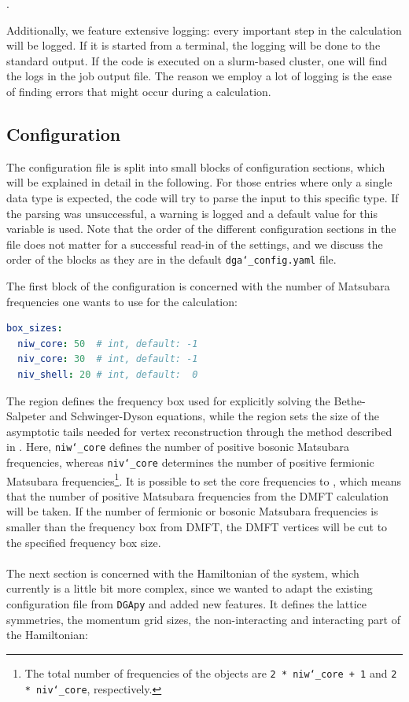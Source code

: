 \documentclass[../../main.tex]{subfiles}
\begin{document}
\mbox{}.

Additionally, we feature extensive logging: every important step in the calculation will be logged. If it is started from a terminal, the logging will be done to the standard output. If the code is executed on a slurm-based cluster, one will find the logs in the job output file. The reason we employ a lot of logging is the ease of finding errors that might occur during a calculation.

\subsection{Configuration}

The configuration file is split into small blocks of configuration sections, which will be explained in detail in the following. For those entries where only a single data type is expected, the code will try to parse the input to this specific type. If the parsing was unsuccessful, a warning is logged and a default value for this variable is used. Note that the order of the different configuration sections in the file does not matter for a successful read-in of the settings, and we discuss the order of the blocks as they are in the default \texttt{dga\char`_config.yaml} file.

The first block of the configuration is concerned with the number of Matsubara frequencies one wants to use for the calculation:

\begin{minipage}{\textwidth}%
\begin{lstlisting}[language=yaml]
box_sizes:
  niw_core: 50  # int, default: -1
  niv_core: 30  # int, default: -1
  niv_shell: 20 # int, default:  0
\end{lstlisting}
\end{minipage}
The  region defines the frequency box used for explicitly solving the Bethe-Salpeter and Schwinger-Dyson equations, while the  region sets the size of the asymptotic tails needed for vertex reconstruction through the method described in . Here, \texttt{niw\char`_core} defines the number of positive bosonic Matsubara frequencies, whereas \texttt{niv\char`_core} determines the number of positive fermionic Matsubara frequencies\footnote{The total number of frequencies of the objects are \texttt{2 * niw\char`_core + 1} and \texttt{2 * niv\char`_core}, respectively.}. It is possible to set the core frequencies to , which means that the number of positive Matsubara frequencies from the DMFT calculation will be taken. If the number of fermionic or bosonic Matsubara frequencies is smaller than the frequency box from DMFT, the DMFT vertices will be cut to the specified frequency box size.
\\\\
The next section is concerned with the Hamiltonian of the system, which currently is a little bit more complex, since we wanted to adapt the existing configuration file from \texttt{DGApy} and added new features. It defines the lattice symmetries, the momentum grid sizes, the non-interacting and interacting part of the Hamiltonian:
\end{document}
